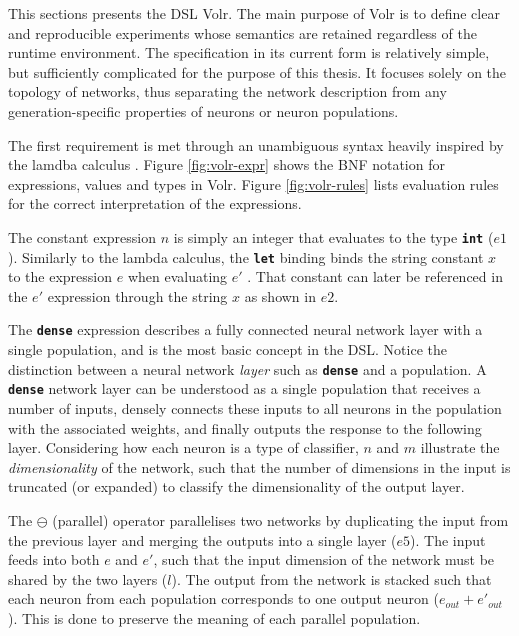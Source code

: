 This sections presents the \gls{DSL} Volr. 
The main purpose of Volr is to define clear and reproducible
experiments whose semantics are retained regardless of
the runtime environment.
The specification in its current form is relatively simple, but sufficiently 
complicated for the purpose of this thesis.
It focuses solely on the topology of networks, thus
separating the network description from any generation-specific properties
of neurons or neuron populations.

The first requirement is met through an unambiguous syntax heavily inspired
by the lamdba calculus \cite{Pierce2002}.
Figure \ref{fig:volr-expr} shows the BNF notation for expressions, values and types
in Volr. 
Figure \ref{fig:volr-rules} lists evaluation rules for the correct
interpretation of the expressions.




The constant expression $n$ is simply an integer that evaluates to the type 
\texttt{\textbf{int}} ($e1$). 
Similarly to the lambda calculus, the \texttt{\textbf{let}} binding binds
the string constant $x$ to the expression $e$ when evaluating $e'$ \cite{Pierce2002}.
That constant can later be referenced in the $e'$ expression 
through the string $x$ as shown in $e2$.

The \texttt{\textbf{dense}} expression describes a fully connected
neural network layer with a single population, and is the most basic
concept in the \gls{DSL}.
Notice the distinction between a neural network \textit{layer}
such as \texttt{\textbf{dense}} and a population. 
A \texttt{\textbf{dense}} network layer can be understood as a single
population that receives a number of inputs, densely 
connects these inputs to all neurons in the population with the associated
weights, and finally outputs the response to the following layer.
Considering how each neuron is a type of classifier, $n$ and $m$
illustrate the \textit{dimensionality} of the network, such that the number of
dimensions in the input is truncated (or expanded) to classify the
dimensionality of the output layer.

The $\ominus$ (parallel) operator parallelises two networks by duplicating
the input from the previous layer and merging the outputs into a single
layer ($e5$).
The input feeds into both $e$ and $e'$, such that the input dimension of
the network must be shared by the two layers ($l$). 
The output from the network is stacked such that each neuron from each
population corresponds to one output neuron ($e_{out} + e'_{out}$).
This is done to preserve the meaning of each parallel population.

